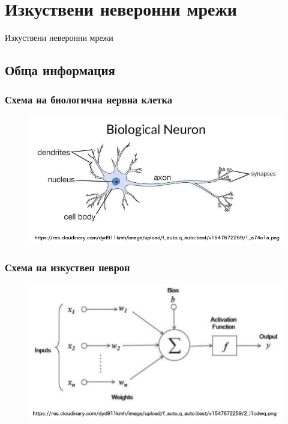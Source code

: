 \documentclass{beamer}
\begin{document}
\section{Изкуствени неверонни мрежи}

\begin{frame}
\center \huge{Изкуствени неверонни мрежи}
\end{frame}

\subsection{Обща информация}

\begin{frame}
\frametitle{Схема на биологична нервна клетка}
\begin{figure}[]\includegraphics[width=\textwidth,height=0.75\textheight]{pic0062}\end{figure}
\end{frame}

\begin{frame}
\frametitle{Схема на изкуствен неврон}
\begin{figure}[]\includegraphics[width=\textwidth,height=0.75\textheight]{pic0063}\end{figure}
\end{frame}
\end{document}
